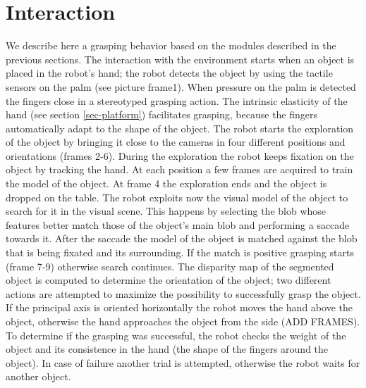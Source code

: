 \section{Interaction}
We describe here a grasping behavior based on the modules described in the previous sections. The interaction with the environment starts when an object is placed in the robot's hand; the robot detects the object by using the tactile sensors on the palm (see picture frame1). When pressure on the palm is detected the fingers close in a stereotyped grasping action. The intrinsic elasticity of the hand (see section \ref{sec-platform}) facilitates grasping, because the fingers automatically adapt to the shape of the object. The robot starts the exploration of the object by bringing it close to the cameras in four different positions and orientations (frames 2-6). During the exploration the robot keeps fixation on the object by tracking the hand. At each position a few frames are acquired to train the model of the object. At frame 4 the exploration ends and the object is dropped on the table. The robot exploits now the visual model of the object to search for it in the visual scene. This happens by selecting the blob whose features better match those of the object's main blob and performing a saccade towards it. After the saccade the model of the object is matched against the blob that is being fixated and its surrounding. If the match is positive grasping starts (frame 7-9) otherwise search continues. The disparity map of the segmented object is computed to determine the orientation of the object; two different actions are attempted to maximize the possibility to successfully grasp the object. If the principal axis is oriented horizontally the robot moves the hand above the object, otherwise the hand approaches the object from the side (ADD FRAMES). To determine if the grasping was successful, the robot checks the weight of the object and its consistence in the hand (the shape of the fingers around the object). In case of failure another trial is attempted, otherwise the robot waits for another object.